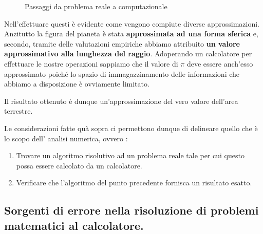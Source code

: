\documentclass[12pt, a4paper]{book}
\theoremstyle{definition}
\begin{document}
\begin{flushleft}
\begin{figure}[h]
	\caption{Passaggi da problema reale a computazionale}
	\label{schema passaggi}
\end{figure}

Nell'effettuare questi è evidente come vengono compiute diverse approssimazioni.  Anzitutto la figura del pianeta è stata \textbf{approssimata ad una forma sferica} e, secondo,  tramite delle valutazioni empiriche abbiamo attribuito \textbf{un valore approssimativo alla lunghezza del raggio}.  Adoperando un calcolatore per effettuare le nostre operazioni sappiamo che il valore di $\pi$ deve essere anch'esso approssimato poiché lo spazio di immagazzinamento delle informazioni che abbiamo a disposizione è ovviamente limitato. 

\vfill
Il risultato ottenuto è dunque un'approssimazione del vero valore dell'area terrestre. 

Le considerazioni fatte quà sopra ci permettono dunque di delineare quello che è lo scopo dell' analisi numerica, ovvero :
\begin{enumerate}
  \item Trovare un algoritmo risolutivo ad un problema reale tale per cui questo possa essere calcolato da un calcolatore.
  \item Verificare che l'algoritmo del punto precedente fornisca un risultato esatto. 
\end{enumerate}
\end{flushleft}

\subsection{Sorgenti di errore nella risoluzione di problemi matematici al calcolatore.}
\end{document}

